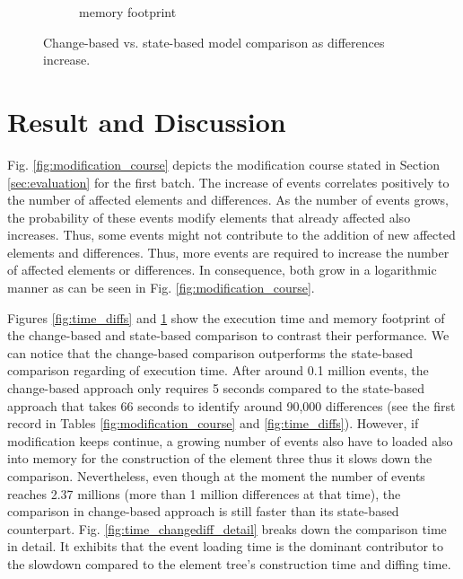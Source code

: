 \documentclass{jot}
\begin{document}
\begin{figure}
\begin{subfigure}[t]{\linewidth}
        \caption{memory footprint}
        \label{fig:memory_diffs}
    \end{subfigure}
    \caption{Change-based vs. state-based model comparison as differences increase.}
    \label{fig:change_vs_state}
\end{figure}

\section{Result and Discussion}
\label{sec:discussion}

Fig. \ref{fig:modification_course} depicts the modification course stated in Section \ref{sec:evaluation} for the first batch. The increase of events correlates positively to the number of affected elements and differences. As the number of events grows, the probability of these events modify elements that already affected also increases. Thus, some events might not contribute to the addition of new affected elements and differences. Thus, more events are required to increase the number of affected elements or differences. In consequence, both grow in a logarithmic manner as can be seen in Fig. \ref{fig:modification_course}. 

Figures \ref{fig:time_diffs} and \ref{fig:memory_diffs} show the execution time and memory footprint of the change-based and state-based comparison to contrast their performance. We can notice that the change-based comparison outperforms the state-based comparison regarding of execution time. After around 0.1 million events, the change-based approach only requires 5 seconds compared to the state-based approach that takes 66 seconds to identify around 90,000 differences (see the first record in Tables \ref{fig:modification_course} and \ref{fig:time_diffs}). However, if modification keeps continue, a growing number of events also have to loaded also into memory for the construction of the element three thus it slows down the comparison. Nevertheless, even though at the moment the number of events reaches 2.37 millions (more than 1 million differences at that time), the comparison in change-based approach is still faster than its state-based counterpart. Fig. \ref{fig:time_changediff_detail} breaks down the comparison time in detail. It exhibits that the event loading time is the dominant contributor to the slowdown compared to the element tree's construction time and diffing time. 
\end{document}

